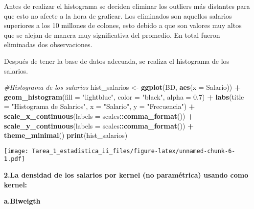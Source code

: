 \documentclass[
]{article}
\newenvironment{Shaded}{\begin{snugshade}}{\end{snugshade}}
\newcommand{\AttributeTok}[1]{\textcolor[rgb]{0.13,0.29,0.53}{#1}}
\newcommand{\CommentTok}[1]{\textcolor[rgb]{0.56,0.35,0.01}{\textit{#1}}}
\newcommand{\DecValTok}[1]{\textcolor[rgb]{0.00,0.00,0.81}{#1}}
\newcommand{\FloatTok}[1]{\textcolor[rgb]{0.00,0.00,0.81}{#1}}
\newcommand{\FunctionTok}[1]{\textcolor[rgb]{0.13,0.29,0.53}{\textbf{#1}}}
\newcommand{\NormalTok}[1]{#1}
\newcommand{\OtherTok}[1]{\textcolor[rgb]{0.56,0.35,0.01}{#1}}
\newcommand{\SpecialCharTok}[1]{\textcolor[rgb]{0.81,0.36,0.00}{\textbf{#1}}}
\newcommand{\StringTok}[1]{\textcolor[rgb]{0.31,0.60,0.02}{#1}}
\begin{document}
Antes de realizar el histograma se deciden eliminar los outliers más
distantes para que esto no afecte a la hora de graficar. Los eliminados
son aquellos salarios superiores a los 10 millones de colones, esto
debido a que son valores muy altos que se alejan de manera muy
significativa del promedio. En total fueron eliminadas dos
observaciones.

\begin{Shaded}
\end{Shaded}

Después de tener la base de datos adecuada, se realiza el histograma de
los salarios.

\begin{Shaded}
\begin{Highlighting}[]
\CommentTok{\#Histograma de los salarios }
\NormalTok{hist\_salarios }\OtherTok{\textless{}{-}} \FunctionTok{ggplot}\NormalTok{(BD, }\FunctionTok{aes}\NormalTok{(}\AttributeTok{x =}\NormalTok{ Salario)) }\SpecialCharTok{+}
  \FunctionTok{geom\_histogram}\NormalTok{(}\AttributeTok{fill =} \StringTok{"lightblue"}\NormalTok{, }\AttributeTok{color =} \StringTok{"black"}\NormalTok{, }\AttributeTok{alpha =} \FloatTok{0.7}\NormalTok{) }\SpecialCharTok{+}
  \FunctionTok{labs}\NormalTok{(}\AttributeTok{title =} \StringTok{"Histograma de Salarios"}\NormalTok{, }\AttributeTok{x =} \StringTok{"Salario"}\NormalTok{, }\AttributeTok{y =} \StringTok{"Frecuencia"}\NormalTok{) }\SpecialCharTok{+} 
  \FunctionTok{scale\_x\_continuous}\NormalTok{(}\AttributeTok{labels =}\NormalTok{ scales}\SpecialCharTok{::}\FunctionTok{comma\_format}\NormalTok{()) }\SpecialCharTok{+}
  \FunctionTok{scale\_y\_continuous}\NormalTok{(}\AttributeTok{labels =}\NormalTok{ scales}\SpecialCharTok{::}\FunctionTok{comma\_format}\NormalTok{()) }\SpecialCharTok{+}
  \FunctionTok{theme\_minimal}\NormalTok{()}
\FunctionTok{print}\NormalTok{(hist\_salarios)}
\end{Highlighting}
\end{Shaded}

\texttt{[image: Tarea\_1\_estadística\_ii\_files/figure-latex/unnamed-chunk-6-1.pdf]}

\textbf{2.La densidad de los salarios por kernel (no paramétrica) usando
como kernel:}

\textbf{a.Biweigth}
\end{document}
